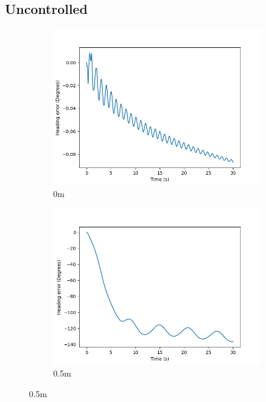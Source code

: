 \documentclass[class=article, crop=false]{standalone}
\begin{document}
\subsection{Uncontrolled}
\begin{figure}
    \centering
    \begin{subfigure}[b]{0.48\textwidth}
        \centering
        \includegraphics{scenario1/rov-0m/0.0m/usv_heading_error_uncontrolled}
        \caption{0m}
        \label{}
    \end{subfigure}
    \hfill
    \begin{subfigure}[b]{0.48\textwidth}
        \centering
        \includegraphics{scenario1/rov-0m/0.5m/usv_heading_error_uncontrolled}
        \caption{0.5m}

\end{subfigure}
\end{figure}
\end{document}
